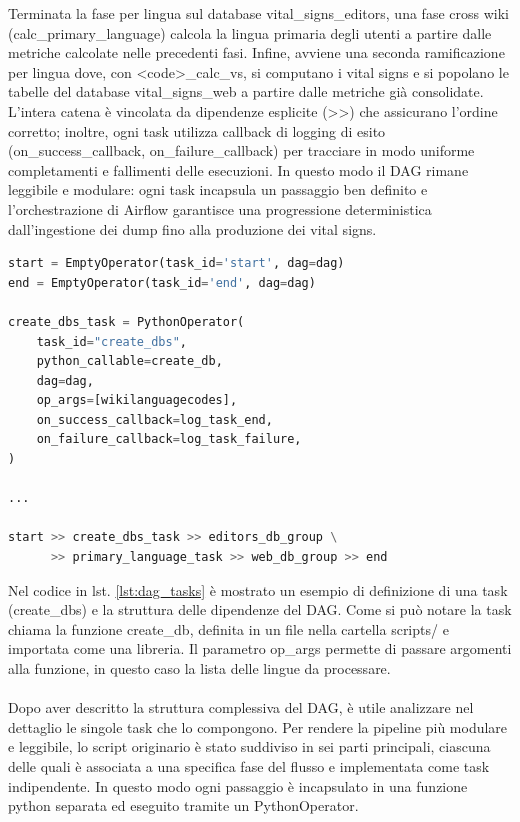 Terminata la fase per lingua sul database vital\_signs\_editors, una fase cross wiki (calc\_primary\_language) calcola la lingua primaria degli utenti a partire dalle metriche calcolate nelle precedenti fasi.
Infine, avviene una seconda ramificazione per lingua dove, con \textless code\textgreater\_calc\_vs, si computano i vital signs e si popolano le tabelle del database  vital\_signs\_web a partire dalle metriche già consolidate.
L’intera catena è vincolata da dipendenze esplicite (\textgreater \textgreater) che assicurano l’ordine corretto; inoltre, ogni task utilizza callback di logging di esito (on\_success\_callback, on\_failure\_callback) per tracciare in modo uniforme completamenti e fallimenti delle esecuzioni.
In questo modo il DAG rimane leggibile e modulare: ogni task incapsula un passaggio ben definito e l’orchestrazione di Airflow garantisce una progressione deterministica dall’ingestione dei dump fino alla produzione dei vital signs.


\begin{lstlisting}[language=Python, caption={Esempio di definizione di una task e dipendenze del DAG}, label=lst:dag_tasks, basicstyle=\scriptsize\ttfamily]
start = EmptyOperator(task_id='start', dag=dag)
end = EmptyOperator(task_id='end', dag=dag)

create_dbs_task = PythonOperator(
    task_id="create_dbs",
    python_callable=create_db,
    dag=dag,
    op_args=[wikilanguagecodes],
    on_success_callback=log_task_end,
    on_failure_callback=log_task_failure,
)

...

start >> create_dbs_task >> editors_db_group \
      >> primary_language_task >> web_db_group >> end
\end{lstlisting}

Nel codice in lst. \ref{lst:dag_tasks} è mostrato un esempio di definizione di una task (create\_dbs) e la struttura delle dipendenze del DAG.
Come si può notare la task chiama la funzione create\_db, definita in un file nella cartella scripts/ e importata come una libreria.
Il parametro op\_args permette di passare argomenti alla funzione, in questo caso la lista delle lingue da processare.
\paragraph{}
Dopo aver descritto la struttura complessiva del DAG, è utile analizzare nel dettaglio le singole task che lo compongono.
Per rendere la pipeline più modulare e leggibile, lo script originario è stato suddiviso in sei parti principali, ciascuna delle quali è associata a una specifica fase del flusso e implementata come task indipendente. In questo modo ogni passaggio è incapsulato in una funzione python separata ed eseguito tramite un PythonOperator.

